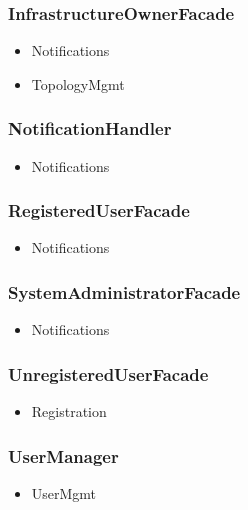     \subsubsection{InfrastructureOwnerFacade}
        \begin{itemize}
            \item Notifications
            \item TopologyMgmt
        \end{itemize}

    \subsubsection{NotificationHandler}
        \begin{itemize}
            \item Notifications
        \end{itemize}

    \subsubsection{RegisteredUserFacade}
        \begin{itemize}
            \item Notifications
        \end{itemize}

    \subsubsection{SystemAdministratorFacade}
        \begin{itemize}
            \item Notifications
        \end{itemize}

    \subsubsection{UnregisteredUserFacade}
        \begin{itemize}
            \item Registration
        \end{itemize}

    \subsubsection{UserManager}
        \begin{itemize}
            \item UserMgmt
        \end{itemize}

